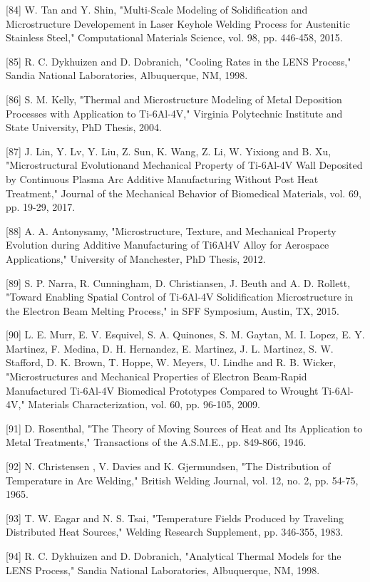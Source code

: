 \documentclass[10pt]{article}
\begin{document}
[84] W. Tan and Y. Shin, "Multi-Scale Modeling of Solidification and Microstructure Developement in Laser Keyhole Welding Process for Austenitic Stainless Steel," Computational Materials Science, vol. 98, pp. 446-458, 2015.

[85] R. C. Dykhuizen and D. Dobranich, "Cooling Rates in the LENS Process," Sandia National Laboratories, Albuquerque, NM, 1998.

[86] S. M. Kelly, "Thermal and Microstructure Modeling of Metal Deposition Processes with Application to Ti-6Al-4V," Virginia Polytechnic Institute and State University, PhD Thesis, 2004.

[87] J. Lin, Y. Lv, Y. Liu, Z. Sun, K. Wang, Z. Li, W. Yixiong and B. Xu, "Microstructural Evolutionand Mechanical Property of Ti-6Al-4V Wall Deposited by Continuous Plasma Arc Additive Manufacturing Without Post Heat Treatment," Journal of the Mechanical Behavior of Biomedical Materials, vol. 69, pp. 19-29, 2017.

[88] A. A. Antonysamy, "Microstructure, Texture, and Mechanical Property Evolution during Additive Manufacturing of Ti6Al4V Alloy for Aerospace Applications," University of Manchester, PhD Thesis, 2012.

[89] S. P. Narra, R. Cunningham, D. Christiansen, J. Beuth and A. D. Rollett, "Toward Enabling Spatial Control of Ti-6Al-4V Solidification Microstructure in the Electron Beam Melting Process," in SFF Symposium, Austin, TX, 2015.

[90] L. E. Murr, E. V. Esquivel, S. A. Quinones, S. M. Gaytan, M. I. Lopez, E. Y. Martinez, F. Medina, D. H. Hernandez, E. Martinez, J. L. Martinez, S. W. Stafford, D. K. Brown, T. Hoppe, W. Meyers, U. Lindhe and R. B. Wicker, "Microstructures and Mechanical Properties of Electron Beam-Rapid Manufactured Ti-6Al-4V Biomedical Prototypes Compared to Wrought Ti-6Al-4V," Materials Characterization, vol. 60, pp. 96-105, 2009.

[91] D. Rosenthal, "The Theory of Moving Sources of Heat and Its Application to Metal Treatments," Transactions of the A.S.M.E., pp. 849-866, 1946.

[92] N. Christensen , V. Davies and K. Gjermundsen, "The Distribution of Temperature in Arc Welding," British Welding Journal, vol. 12, no. 2, pp. 54-75, 1965.

[93] T. W. Eagar and N. S. Tsai, "Temperature Fields Produced by Traveling Distributed Heat Sources," Welding Research Supplement, pp. 346-355, 1983.

[94] R. C. Dykhuizen and D. Dobranich, "Analytical Thermal Models for the LENS Process," Sandia National Laboratories, Albuquerque, NM, 1998.
\end{document}
